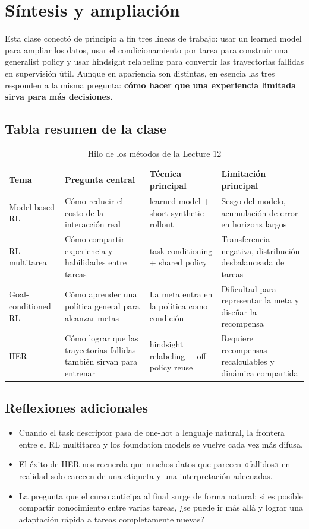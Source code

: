 \section{Síntesis y ampliación}

Esta clase conectó de principio a fin tres líneas de trabajo: usar un learned model para ampliar los datos, usar el condicionamiento por tarea para construir una generalist policy y usar hindsight relabeling para convertir las trayectorias fallidas en supervisión útil. Aunque en apariencia son distintas, en esencia las tres responden a la misma pregunta: \textbf{cómo hacer que una experiencia limitada sirva para más decisiones.}

\subsection{Tabla resumen de la clase}

\begin{table}[H]
\centering
\begin{tabular}{p{} p{} p{} p{}}
\toprule
Tema & Pregunta central & Técnica principal & Limitación principal \\
\midrule
Model-based RL & Cómo reducir el costo de la interacción real & learned model + short synthetic rollout & Sesgo del modelo, acumulación de error en horizons largos \\
RL multitarea & Cómo compartir experiencia y habilidades entre tareas & task conditioning + shared policy & Transferencia negativa, distribución desbalanceada de tareas \\
Goal-conditioned RL & Cómo aprender una política general para alcanzar metas & La meta entra en la política como condición & Dificultad para representar la meta y diseñar la recompensa \\
HER & Cómo lograr que las trayectorias fallidas también sirvan para entrenar & hindsight relabeling + off-policy reuse & Requiere recompensas recalculables y dinámica compartida \\
\bottomrule
\end{tabular}
\caption{Hilo de los métodos de la Lecture 12}
\end{table}

\subsection{Reflexiones adicionales}

\begin{itemize}
    \item Cuando el task descriptor pasa de one-hot a lenguaje natural, la frontera entre el RL multitarea y los foundation models se vuelve cada vez más difusa.
    \item El éxito de HER nos recuerda que muchos datos que parecen «fallidos» en realidad solo carecen de una etiqueta y una interpretación adecuadas.
    \item La pregunta que el curso anticipa al final surge de forma natural: si es posible compartir conocimiento entre varias tareas, ¿se puede ir más allá y lograr una adaptación rápida a tareas completamente nuevas?
\end{itemize}

